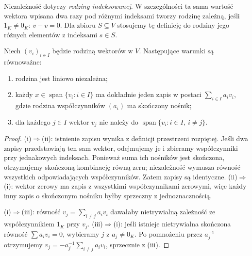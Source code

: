 Niezależność dotyczy \emph{rodziny indeksowanej}.
W szczególności ta sama wartość wektora wpisana dwa razy
pod różnymi indeksami tworzy rodzinę zależną, jeśli \(1_K\neq0_K\):
\(v-v=0\). Dla zbioru \(S\subseteq V\) stosujemy
tę definicję do rodziny jego różnych elementów
z indeksami \(s\in S\).

\begin{lemat}
\label{lem:lin-niezaleznosc-kryteria}
Niech \((v_i)_{i\in I}\) będzie rodziną wektorów w \(V\).
Następujące warunki są równoważne:
\begin{enumerate}[label=(\roman*)]
\item rodzina jest liniowo niezależna;
\item każdy \(x\in\operatorname{span}\{v_i:i\in I\}\)
      ma dokładnie jeden zapis w postaci
      \(\sum_{i\in I}a_iv_i\), gdzie rodzina
      współczynników \((a_i)\) ma skończony nośnik;
\item dla każdego \(j\in I\) wektor \(v_j\)
      nie należy do \(\operatorname{span}\{v_i:i\in I,\ i\neq j\}\).
\end{enumerate}
\end{lemat}
\begin{proof}
(i)\(\Rightarrow\)(ii): istnienie zapisu wynika z definicji
przestrzeni rozpiętej. Jeśli dwa zapisy przedstawiają
ten sam wektor, odejmujemy je i zbieramy współczynniki
przy jednakowych indeksach. Ponieważ suma ich nośników
jest skończona, otrzymujemy skończoną kombinację równą zeru;
niezależność wymusza równość wszystkich odpowiadających
współczynników. Zatem zapisy są identyczne.
(ii)\(\Rightarrow\)(i): wektor zerowy ma zapis z wszystkimi
współczynnikami zerowymi, więc każdy inny zapis o
skończonym nośniku byłby sprzeczny z jednoznacznością.

(i)\(\Rightarrow\)(iii): równość
\(v_j=\sum_{i\neq j}a_iv_i\) dawałaby
nietrywialną zależność ze współczynnikiem \(1_K\)
przy \(v_j\).
(iii)\(\Rightarrow\)(i): jeśli istnieje nietrywialna
skończona równość \(\sum a_iv_i=0\), wybieramy
\(j\) z \(a_j\neq0_K\). Po pomnożeniu przez
\(a_j^{-1}\) otrzymujemy
\(v_j=-a_j^{-1}\sum_{i\neq j}a_iv_i\),
sprzecznie z (iii).
\end{proof}

